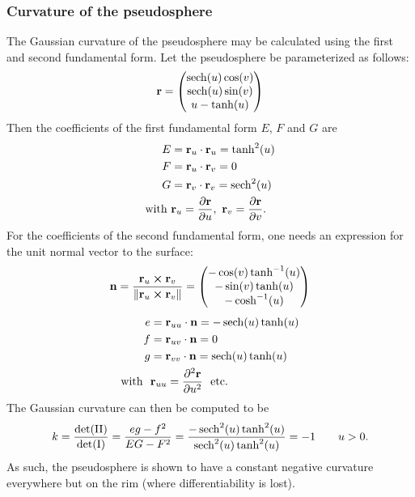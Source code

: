 \subsubsection{Curvature of the pseudosphere}
The Gaussian curvature of the pseudosphere may be calculated using the first and second fundamental form. Let the pseudosphere be parameterized as follows: 
    \[ 
        \vb{r} = \mqty(\sech(u)\cos(v)\\
        \sech(u)\sin(v)\\
                  u - \tanh(u))
    \]
Then the coefficients of the first fundamental form \(E\), \(F\) and \(G\) are
    \[
        \begin{split}
            E &= \vb{r}_u \cdot \vb{r}_u = \tanh[2](u) \\
            F &= \vb{r}_u \cdot \vb{r}_v = 0 \\
            G &= \vb{r}_v \cdot \vb{r}_v = \sech[2](u) \\
            \text{with } & \vb{r}_u = \pdv{\vb{r}}{u},\ \vb{r}_v = \pdv{\vb{r}}{v}.
        \end{split}
    \]
For the coefficients of the second fundamental form, one needs an expression for the unit normal vector to the surface:
    \[
        \vb{n} =  \frac{\vb{r}_u \cross \vb{r}_v}{\norm{\vb{r}_u \cross \vb{r}_v}} 
        = \mqty(-\cos(v)\tanh[-1](u) \\
                -\sin(v)\tanh(u)\\
                -\cosh[-1](u)\\
                )
    \]
\begin{equation*}
    \begin{split}
        e &= \vb{r}_{uu} \cdot \vb{n} = -\sech(u)\tanh(u)\\
        f &= \vb{r}_{uv} \cdot \vb{n} = 0\\
        g &= \vb{r}_{vv} \cdot \vb{n} = \sech(u)\tanh(u)\\
        \text{with }\ & \vb{r}_{uu} = \pdv[2]{\vb{r}}{u}\ \text{ etc.}
    \end{split}
\end{equation*}
The Gaussian curvature can then be computed to be \cite{ONeill2006}
\begin{equation}
    k = \frac{\det(\mathrm{II})}{\det(\mathrm{I})} = \frac{eg - f^2}{EG - F^2} 
      = \frac{-\sech[2](u)\tanh[2](u)}{\sech[2](u)\tanh[2](u)} = -1 \qquad u > 0.
\end{equation}
As such, the pseudosphere is shown to have a constant negative curvature everywhere but on the rim (where differentiability is lost).

